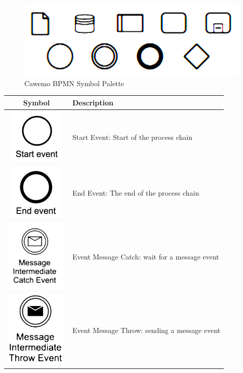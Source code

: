 \documentclass[]{book}
\begin{document}
\begin{figure}
\centering
\includegraphics{images/cawemopalette.png}
\caption{Cawemo BPMN Symbol Palette}
\end{figure}

\begin{longtable}[]{@{}cl@{}}
\toprule
Symbol & Description\tabularnewline
\midrule
\endhead
\includegraphics{images/start-event.png} & Start Event: Start of the process chain\tabularnewline
\includegraphics{images/end-event.png} & End Event: The end of the process chain\tabularnewline
\includegraphics{images/event-message-catch.png} & Event Message Catch: wait for a message event\tabularnewline
\includegraphics{images/event-message-throw.png} & Event Message Throw: sending a message event\tabularnewline

\end{longtable}
\end{document}
